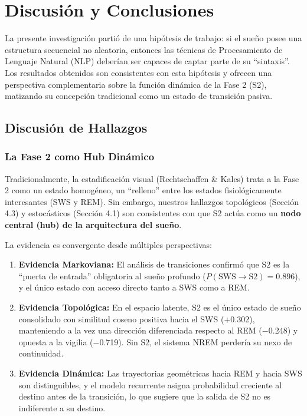 \chapter{Discusión y Conclusiones}
\label{conclusiones}

La presente investigación partió de una hipótesis de trabajo: si el sueño posee una estructura secuencial no aleatoria, entonces las técnicas de Procesamiento de Lenguaje Natural (NLP) deberían ser capaces de captar parte de su ``sintaxis''. Los resultados obtenidos son consistentes con esta hipótesis y ofrecen una perspectiva complementaria sobre la función dinámica de la Fase 2 (S2), matizando su concepción tradicional como un estado de transición pasiva.

\section{Discusión de Hallazgos}

\subsection{La Fase 2 como Hub Dinámico}

Tradicionalmente, la estadificación visual (Rechtschaffen \& Kales) trata a la Fase 2 como un estado homogéneo, un ``relleno'' entre los estados fisiológicamente interesantes (SWS y REM). Sin embargo, nuestros hallazgos topológicos (Sección 4.3) y estocásticos (Sección 4.1) son consistentes con que S2 actúa como un \textbf{nodo central (hub) de la arquitectura del sueño}.

La evidencia es convergente desde múltiples perspectivas:
\begin{enumerate}
    \item \textbf{Evidencia Markoviana:} El análisis de transiciones confirmó que S2 es la ``puerta de entrada'' obligatoria al sueño profundo ($P(\text{SWS} \to \text{S2}) = 0.896$), y el único estado con acceso directo tanto a SWS como a REM.
    
    \item \textbf{Evidencia Topológica:} En el espacio latente, S2 es el único estado de sueño consolidado con similitud coseno positiva hacia el SWS ($+$0.302), manteniendo a la vez una dirección diferenciada respecto al REM ($-$0.248) y opuesta a la vigilia ($-$0.719). Sin S2, el sistema NREM perdería su nexo de continuidad.
    
    \item \textbf{Evidencia Dinámica:} Las trayectorias geométricas hacia REM y hacia SWS son distinguibles, y el modelo recurrente asigna probabilidad creciente al destino antes de la transición, lo que sugiere que la salida de S2 no es indiferente a su destino.
\end{enumerate}


